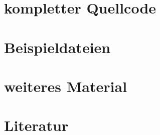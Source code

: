 \documentclass[12pt]{article}
\begin{document}
\appendix

\section{kompletter Quellcode}

\section{Beispieldateien}

\section{weiteres Material}

\section{Literatur}

\renewcommand{\section}[2]{}

\end{document}
